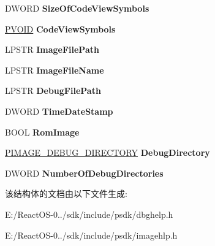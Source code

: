 \begin{DoxyCompactItemize}
D\+W\+O\+RD {\bfseries Size\+Of\+Code\+View\+Symbols}
\item 
\mbox{\label{struct___i_m_a_g_e___d_e_b_u_g___i_n_f_o_r_m_a_t_i_o_n_a51a1ea611a0b66eda3162a67ed6b058d}} 
\hyperlink{interfacevoid}{P\+V\+O\+ID} {\bfseries Code\+View\+Symbols}
\item 
\mbox{\label{struct___i_m_a_g_e___d_e_b_u_g___i_n_f_o_r_m_a_t_i_o_n_a1e2222b4e2ef0b954e3d4c5a439d48b4}} 
L\+P\+S\+TR {\bfseries Image\+File\+Path}
\item 
\mbox{\label{struct___i_m_a_g_e___d_e_b_u_g___i_n_f_o_r_m_a_t_i_o_n_adb8a7f30d1e44dd81be95addee46a79c}} 
L\+P\+S\+TR {\bfseries Image\+File\+Name}
\item 
\mbox{\label{struct___i_m_a_g_e___d_e_b_u_g___i_n_f_o_r_m_a_t_i_o_n_adcd96e1443756c1c61d2a7c6c367d5b8}} 
L\+P\+S\+TR {\bfseries Debug\+File\+Path}
\item 
\mbox{\label{struct___i_m_a_g_e___d_e_b_u_g___i_n_f_o_r_m_a_t_i_o_n_a30108be4db360b15a2381828e8917bf0}} 
D\+W\+O\+RD {\bfseries Time\+Date\+Stamp}
\item 
\mbox{\label{struct___i_m_a_g_e___d_e_b_u_g___i_n_f_o_r_m_a_t_i_o_n_a1b479ccc4e4fc761226e37eb705b8c9a}} 
B\+O\+OL {\bfseries Rom\+Image}
\item 
\mbox{\label{struct___i_m_a_g_e___d_e_b_u_g___i_n_f_o_r_m_a_t_i_o_n_afb7c16a9621164f7a136fbed2095a540}} 
\hyperlink{struct___i_m_a_g_e___d_e_b_u_g___d_i_r_e_c_t_o_r_y}{P\+I\+M\+A\+G\+E\+\_\+\+D\+E\+B\+U\+G\+\_\+\+D\+I\+R\+E\+C\+T\+O\+RY} {\bfseries Debug\+Directory}
\item 
\mbox{\label{struct___i_m_a_g_e___d_e_b_u_g___i_n_f_o_r_m_a_t_i_o_n_ab8fa30dee4a78fd57815ffbc523e4875}} 
D\+W\+O\+RD {\bfseries Number\+Of\+Debug\+Directories}
\end{DoxyCompactItemize}


该结构体的文档由以下文件生成\+:\begin{DoxyCompactItemize}
\item 
E\+:/\+React\+O\+S-\/0../sdk/include/psdk/dbghelp.\+h\item 
E\+:/\+React\+O\+S-\/0../sdk/include/psdk/imagehlp.\+h\end{DoxyCompactItemize}
